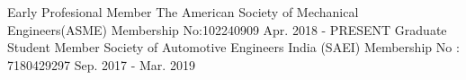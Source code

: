 \begin{cventries}
  \cventry
    {Early Profesional Member}
    {The American Society of Mechanical Engineers(ASME)}
    {Membership No:102240909}
    {Apr. 2018 - PRESENT}
{
}
  \cventry
    {Graduate Student Member}
    {Society of Automotive Engineers India (SAEI)}
    {Membership No : 7180429297}
    {Sep. 2017 - Mar. 2019}
{
 \begin{cvitems}
\end{cvitems}
}
\end{cventries}
